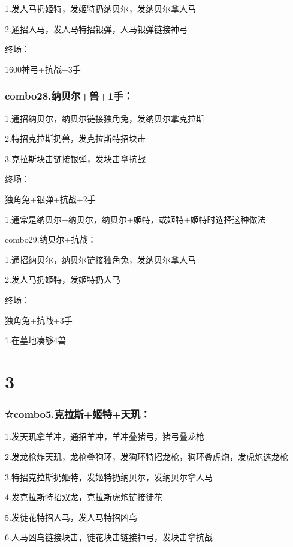 \documentclass[
]{article}
\begin{document}
1.发人马扔姬特，发姬特扔纳贝尔，发纳贝尔拿人马

2.通招人马，发人马特招银弹，人马银弹链接神弓

终场：

1600神弓+抗战+3手

\hypertarget{combo28.ux7eb3ux8d1dux5c14ux517d1ux624b}{%
\subsubsection{combo28.纳贝尔+兽+1手：}\label{combo28.ux7eb3ux8d1dux5c14ux517d1ux624b}}

1.通招纳贝尔，纳贝尔链接独角兔，发纳贝尔拿克拉斯

2.特招克拉斯扔兽，发克拉斯特招块击

3.克拉斯块击链接银弹，发块击拿抗战

终场：

独角兔+银弹+抗战+2手

1.通常是纳贝尔+纳贝尔，纳贝尔+姬特，或姬特+姬特时选择这种做法

combo29.纳贝尔+抗战：

1.通招纳贝尔，纳贝尔链接独角兔，发纳贝尔拿人马

2.发人马扔姬特，发姬特扔人马

终场：

独角兔+抗战+3手

1.在墓地凑够4兽

\hypertarget{section-2}{%
\section{3}\label{section-2}}

\hypertarget{combo5.ux514bux62c9ux65afux59ecux7279ux5929ux7391}{%
\subsubsection{☆combo5.克拉斯+姬特+天玑：}\label{combo5.ux514bux62c9ux65afux59ecux7279ux5929ux7391}}

1.发天玑拿羊冲，通招羊冲，羊冲叠猪弓，猪弓叠龙枪

2.发龙枪炸天玑，龙枪叠狗环，发狗环特招龙枪，狗环叠虎炮，发虎炮选龙枪

3.特招克拉斯扔姬特，发姬特扔纳贝尔，发纳贝尔拿人马

4.发克拉斯特招双龙，克拉斯虎炮链接徒花

5.发徒花特招人马，发人马特招凶鸟

6.人马凶鸟链接块击，徒花块击链接神弓，发块击拿抗战
\end{document}
